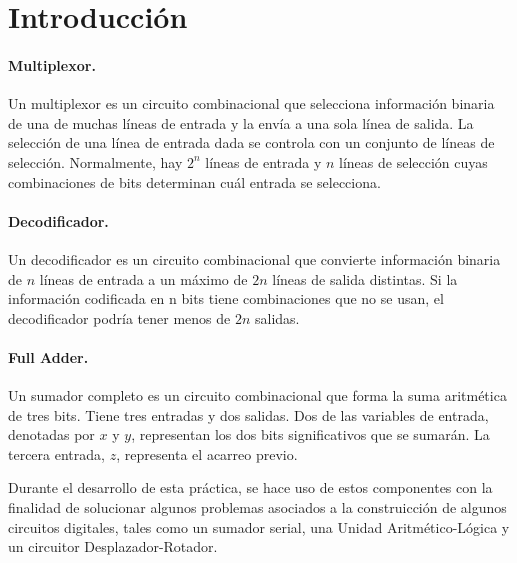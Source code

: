 \documentclass[../main.tex]{subfiles}
\begin{document}
\clearpage
\section{Introducción}
\paragraph{Multiplexor.} Un multiplexor es un circuito combinacional que 
selecciona información binaria de una de muchas líneas de entrada y la envía a 
una sola línea de salida. La selección de una línea de entrada dada se 
controla con un conjunto de líneas de selección. Normalmente, hay $2^n$ líneas 
de entrada y $n$ líneas de selección cuyas combinaciones de bits determinan 
cuál entrada se selecciona.

\paragraph{Decodificador.} Un decodificador es un circuito combinacional que 
convierte información binaria de $n$ líneas de entrada a un máximo de $2n$ 
líneas de salida distintas.  Si la información codificada en n bits tiene 
combinaciones que no se usan, el decodificador podría tener menos de
$2n$ salidas.

\paragraph{Full Adder.} Un sumador completo es un circuito combinacional que 
forma la suma aritmética de tres bits.  Tiene tres entradas y dos salidas. Dos 
de las variables de entrada, denotadas por $x$ y $y$, representan los dos bits 
significativos que se sumarán. La tercera entrada, $z$, representa el acarreo 
previo.

Durante el desarrollo de esta práctica, se hace uso de estos componentes con 
la finalidad de solucionar algunos problemas asociados a la construicción de 
algunos circuitos digitales, tales como un sumador serial, una Unidad 
Aritmético-Lógica y un circuitor Desplazador-Rotador.
\end{document}
